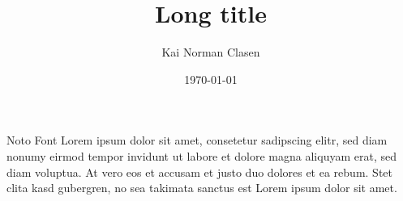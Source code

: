 \documentclass[aspectratio=169]{beamer}
\title[Noto Font]{Long title}
\author{Kai Norman Clasen}
\institute{}
\date{\today}
\begin{document}
\begin{frame}{Noto Font}
  Lorem ipsum dolor sit amet, consetetur sadipscing elitr,
  sed diam nonumy eirmod tempor invidunt ut labore et dolore
  magna aliquyam erat, sed diam voluptua.
  At vero eos et accusam et justo duo dolores et ea rebum.
  Stet clita kasd gubergren, no sea takimata sanctus est
  Lorem ipsum dolor sit amet.
\end{frame}
\end{document}
